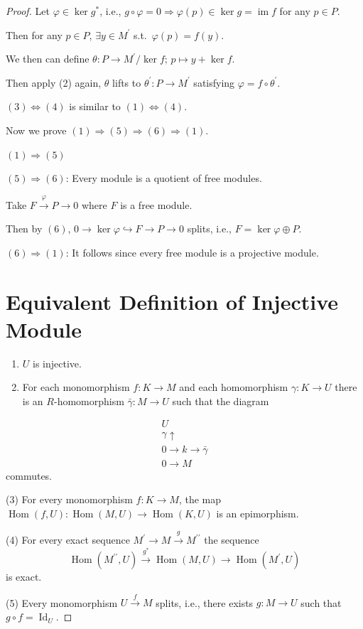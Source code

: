 \documentclass[11pt, a4paper]{report}
\begin{document}
\begin{proof}
Let $\varphi \in \operatorname{ker} g^{*}$, i.e., $g \circ \varphi=0 \Rightarrow \varphi(p) \in \operatorname{ker} g=\operatorname{im} f$ for any $p \in P$.

Then for any $p \in P$, $\exists y \in M^{\prime}$ s.t.\ $\varphi(p)=f(y)$.

We then can define $\theta: P \rightarrow M^{\prime} / \operatorname{ker} f;\, p \mapsto y+\operatorname{ker} f$.

Then apply (2) again, $\theta$ lifts to $\theta^{\prime}: P \rightarrow M^{\prime}$ satisfying $\varphi=f \circ \theta^{\prime}$.

$(3) \Leftrightarrow (4)$ is similar to $(1) \Leftrightarrow (4)$.

Now we prove $(1) \Rightarrow (5) \Rightarrow (6) \Rightarrow (1)$.

$(1) \Rightarrow (5)$

$(5) \Rightarrow (6)$: Every module is a quotient of free modules.

Take $F \xrightarrow{\varphi} P \rightarrow 0$ where $F$ is a free module.

Then by $(6)$, $0 \rightarrow \operatorname{ker} \varphi \hookrightarrow F \rightarrow P \rightarrow 0$ splits, i.e., $F=\operatorname{ker} \varphi \oplus P$.

$(6) \Rightarrow (1)$: It follows since every free module is a projective module.

\section*{Equivalent Definition of Injective Module}

\begin{enumerate}
    \item $U$ is injective.
    \item For each monomorphism $f: K \rightarrow M$ and each homomorphism $\gamma: K \rightarrow U$ there is an $R$-homomorphism $\bar{\gamma}: M \rightarrow U$ such that the diagram
\end{enumerate}
\[
\begin{array}{r}
U \\
\gamma \uparrow \\
0 \rightarrow k \rightarrow \bar{\gamma} \\
0 \rightarrow M
\end{array}
\]
commutes.

(3) For every monomorphism $f: K \rightarrow M$, the map $\operatorname{Hom}(f, U): \operatorname{Hom}(M, U) \rightarrow \operatorname{Hom}(K, U)$ is an epimorphism.

(4) For every exact sequence $M^{\prime} \rightarrow M \xrightarrow{g} M^{\prime \prime}$ the sequence
\[
\operatorname{Hom}\left(M^{\prime \prime}, U\right) \xrightarrow{g^{*}} \operatorname{Hom}(M, U) \rightarrow \operatorname{Hom}\left(M^{\prime}, U\right)
\]
is exact.

(5) Every monomorphism $U \xrightarrow{f} M$ splits, i.e., there exists $g: M \rightarrow U$ such that $g \circ f = \operatorname{Id}_U$.

\end{proof}
\end{document}
